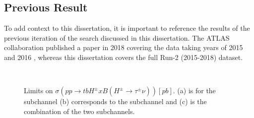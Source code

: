 	\subsection{Previous Result}\label{ssec:Prev Hpm}
		To add context to this dissertation, it is important to reference the results of the previous iteration of the search discussed in this dissertation. The ATLAS collaboration published a paper in 2018 covering the data taking years of 2015 and 2016 \cite{hpm-previous}, whereas this dissertation covers the full Run-2 (2015-2018) dataset. 
		\begin{figure}[!h]
			\centering
			 \\
			\caption{\label{fig:hpm-prev-limits} Limits on $\sigma(pp \rightarrow tbH^{\pm} x B(H^{\pm} \rightarrow \tau^\pm \nu)) [pb]$. (a) is for the \taujets subchannel (b) corresponds to the \taulep subchannel and (c) is the combination of the two subchannels. \cite{hpm-previous} }
		\end{figure}
